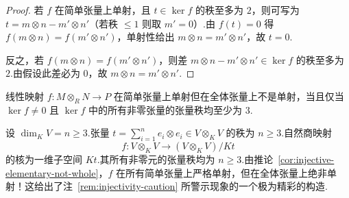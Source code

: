 \begin{proof}
若 $f$ 在简单张量上单射，且 $t \in \ker f$ 的秩至多为 $2$，则可写为 $t = m \otimes n - m' \otimes n'$（若秩 $\leq 1$ 则取 $m' = 0$）.由 $f(t) = 0$ 得 $f(m \otimes n) = f(m' \otimes n')$，单射性给出 $m \otimes n = m' \otimes n'$，故 $t = 0$.

反之，若 $f(m \otimes n) = f(m' \otimes n')$，则差 $m \otimes n - m' \otimes n' \in \ker f$ 的秩至多为 $2$.由假设此差必为 $0$，故 $m \otimes n = m' \otimes n'$.
\end{proof}

\begin{corollary}\label{cor:injective-elementary-not-whole}
线性映射 $f \colon M \otimes_R N \to P$ 在简单张量上单射但在全体张量上不是单射，当且仅当 $\ker f \neq 0$ 且 $\ker f$ 中的所有非零张量的张量秩均至少为 $3$.
\end{corollary}

\begin{example}\label{ex:grinberg-counterexample}
设 $\dim_K V = n \geq 3$.张量 $t = \sum_{i=1}^n e_i \otimes e_i \in V \otimes_K V$ 的秩为 $n \geq 3$.自然商映射
\[
  f \colon V \otimes_K V \to (V \otimes_K V) / Kt
\]
的核为一维子空间 $Kt$.其所有非零元的张量秩均为 $n \geq 3$.由推论~\ref{cor:injective-elementary-not-whole}，$f$ 在所有简单张量上严格单射，但在全体张量上绝非单射！这给出了注~\ref{rem:injectivity-caution} 所警示现象的一个极为精彩的构造.
\end{example}
